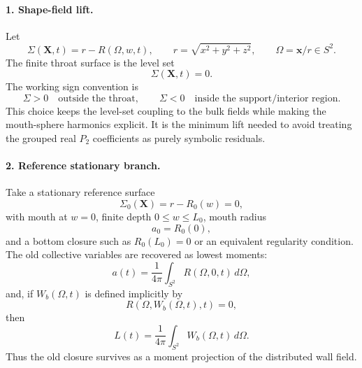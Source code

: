\paragraph{1. Shape-field lift.}
Let
\begin{equation}
\label{eq:app-stage001-sigma}
\Sigma(\mathbf X,t)=r-R(\Omega,w,t),
\qquad
r=\sqrt{x^2+y^2+z^2},
\qquad
\Omega=\mathbf x/r\in S^2.
\end{equation}
The finite throat surface is the level set
\begin{equation}
\label{eq:app-stage001-surface}
\Sigma(\mathbf X,t)=0.
\end{equation}
The working sign convention is
\begin{equation}
\Sigma>0\quad\text{outside the throat},
\qquad
\Sigma<0\quad\text{inside the support/interior region}.
\end{equation}
This choice keeps the level-set coupling to the bulk fields while making the mouth-sphere harmonics explicit.  It is the minimum lift needed to avoid treating the grouped real \(P_2\) coefficients as purely symbolic residuals.

\paragraph{2. Reference stationary branch.}
Take a stationary reference surface
\begin{equation}
\label{eq:app-stage001-reference}
\Sigma_0(\mathbf X)=r-R_0(w)=0,
\end{equation}
with mouth at \(w=0\), finite depth \(0\le w\le L_0\), mouth radius
\begin{equation}
\label{eq:app-stage001-a0}
a_0=R_0(0),
\end{equation}
and a bottom closure such as \(R_0(L_0)=0\) or an equivalent regularity condition.  The old collective variables are recovered as lowest moments:
\begin{equation}
\label{eq:app-stage001-a-moment}
a(t)=\frac{1}{4\pi}\int_{S^2}R(\Omega,0,t)\,d\Omega,
\end{equation}
and, if \(W_b(\Omega,t)\) is defined implicitly by
\begin{equation}
R(\Omega,W_b(\Omega,t),t)=0,
\end{equation}
then
\begin{equation}
\label{eq:app-stage001-l-moment}
L(t)=\frac{1}{4\pi}\int_{S^2}W_b(\Omega,t)\,d\Omega.
\end{equation}
Thus the old closure survives as a moment projection of the distributed wall field.

